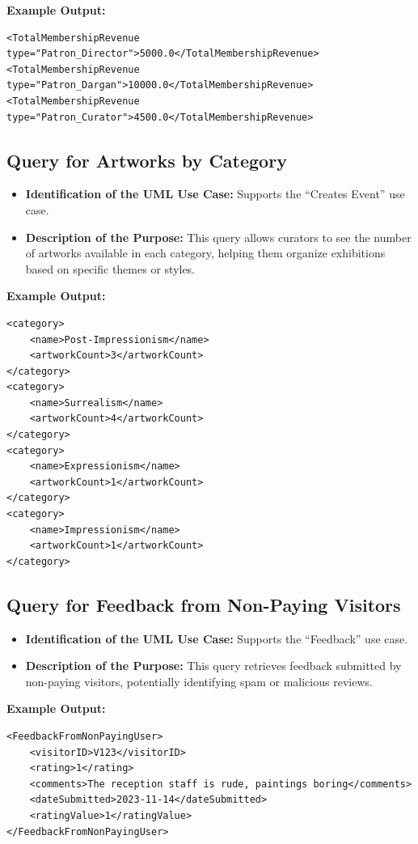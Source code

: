 \documentclass{article} %
\begin{document}
\textbf{Example Output:}
\begin{verbatim}
<TotalMembershipRevenue type="Patron_Director">5000.0</TotalMembershipRevenue>
<TotalMembershipRevenue type="Patron_Dargan">10000.0</TotalMembershipRevenue>
<TotalMembershipRevenue type="Patron_Curator">4500.0</TotalMembershipRevenue>
\end{verbatim}

\subsection{Query for Artworks by Category}
\begin{itemize}
    \item \textbf{Identification of the UML Use Case:} Supports the ``Creates Event'' use case.
    \item \textbf{Description of the Purpose:} This query allows curators to see the number of artworks available in each category, helping them organize exhibitions based on specific themes or styles.
\end{itemize}

\textbf{Example Output:}
\begin{verbatim}
<category>
    <name>Post-Impressionism</name>
    <artworkCount>3</artworkCount>
</category>
<category>
    <name>Surrealism</name>
    <artworkCount>4</artworkCount>
</category>
<category>
    <name>Expressionism</name>
    <artworkCount>1</artworkCount>
</category>
<category>
    <name>Impressionism</name>
    <artworkCount>1</artworkCount>
</category>
\end{verbatim}

\subsection{Query for Feedback from Non-Paying Visitors}
\begin{itemize}
    \item \textbf{Identification of the UML Use Case:} Supports the ``Feedback'' use case.
    \item \textbf{Description of the Purpose:} This query retrieves feedback submitted by non-paying visitors, potentially identifying spam or malicious reviews.
\end{itemize}

\textbf{Example Output:}
\begin{verbatim}
<FeedbackFromNonPayingUser>
    <visitorID>V123</visitorID>
    <rating>1</rating>
    <comments>The reception staff is rude, paintings boring</comments>
    <dateSubmitted>2023-11-14</dateSubmitted>
    <ratingValue>1</ratingValue>
</FeedbackFromNonPayingUser>
\end{verbatim}
\end{document}
